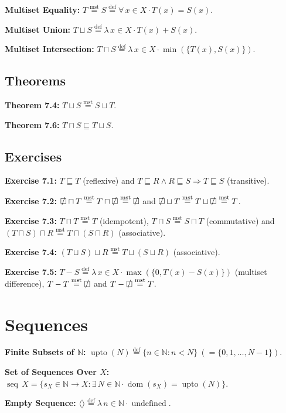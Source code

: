 \documentclass[12pt]{article}
\newcommand{\defeq}{\stackrel{\text{def}}{=}}
\newcommand{\msteq}{\stackrel{\text{mst}}{=}}
\newcommand{\sqemptyset}{\ensurestackMath{\stackinset{c}{}{c}{}{/}{\square}}}
\DeclareMathOperator{\jseq}{seq}
\DeclareMathOperator{\jdom}{dom}
\DeclareMathOperator{\jupto}{upto}
\DeclareMathOperator{\jundefined}{undefined}
\theoremstyle{plain}
\begin{document}
\textbf{Multiset Equality:} $T \msteq S \defeq \forall\, x \in X
\cdot T(x) = S(x)$.

\textbf{Multiset Union:} $T \sqcup S \defeq \lambda\, x \in X
\cdot T(x) + S(x)$.

\textbf{Multiset Intersection:} $T \sqcap S \defeq \lambda\, x
\in X \cdot \min(\{T(x), S(x)\})$.

\subsection{Theorems}

\textbf{Theorem 7.4:} $T \sqcup S \msteq S \sqcup T$.

\textbf{Theorem 7.6:} $T \sqcap S \sqsubseteq T \sqcup S$.

\subsection{Exercises}

\textbf{Exercise 7.1:} $T \sqsubseteq T$ (reflexive) and $T
\sqsubseteq R \land R \sqsubseteq S \Rightarrow T \sqsubseteq S$
(transitive).

\textbf{Exercise 7.2:} $\sqemptyset \sqcap T \msteq T \sqcap
\sqemptyset \msteq \sqemptyset$ and $\sqemptyset \sqcup T \msteq
T \sqcup \sqemptyset \msteq T$.

\textbf{Exercise 7.3:} $T \sqcap T \msteq T$ (idempotent), $T
\sqcap S \msteq S \sqcap T$ (commutative) and $(T \sqcap S)
\sqcap R \msteq T \sqcap (S \sqcap R)$ (associative).

\textbf{Exercise 7.4:} $(T \sqcup S)
\sqcup R \msteq T \sqcup (S \sqcup R)$ (associative).

\textbf{Exercise 7.5:} $T - S \defeq \lambda\, x \in X \cdot
\max(\{0, T(x) - S(x)\})$ (multiset difference), $T - T \msteq
\sqemptyset$ and $T - \sqemptyset \msteq T$.

\section{Sequences}

\textbf{Finite Subsets of $\mathbb{N}$:} $\jupto(N)
\defeq \{n \in \mathbb{N} : n < N\}\ (= \{0, 1, \ldots, N - 1\})$.

\textbf{Set of Sequences Over $X$:} $\jseq\, X = \{s_X \in
\mathbb{N} \rightarrow X : \exists\, N \in \mathbb{N} \cdot
\jdom(s_X) = \jupto(N)\}$.

\textbf{Empty Sequence:} $\langle \rangle \defeq \lambda\, n \in
\mathbb{N} \cdot \jundefined$.
\end{document}
